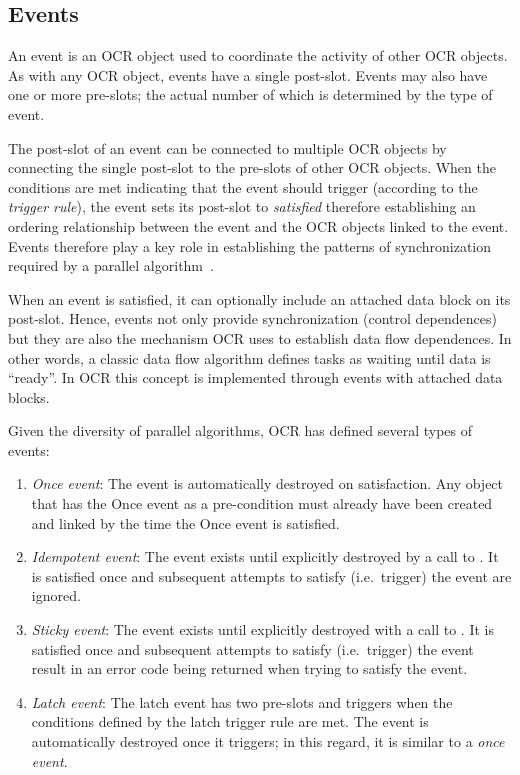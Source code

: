 \subsection{Events}
\label{sec:Event}

An event is an OCR object used to coordinate the activity of other OCR
objects. As with any OCR object, events have a single
post-slot. Events may also have one or more pre-slots; the actual
number of which is determined by the type of event.

The post-slot of an event can be connected to multiple OCR objects by
connecting the single post-slot to the pre-slots of other OCR objects.
When the conditions are met indicating that the event should trigger
(according to the \emph{trigger rule}), the event
sets its post-slot to \emph{satisfied} therefore establishing an
ordering relationship between the event and the OCR objects linked to
the event. Events therefore play a key role in establishing the
patterns of synchronization required by a parallel
algorithm~\cite{ImSa14-2}.

When an event is satisfied, it can optionally include an attached
data block on its post-slot. Hence, events not only provide synchronization
(control dependences) but they are also the mechanism OCR uses to
establish data flow dependences. In other words, a classic data flow
algorithm defines tasks as waiting until data is ``ready''. In OCR
this concept is implemented through events with attached data blocks.

Given the diversity of parallel algorithms, OCR has defined several
types of events:
\begin{enumerate}
\item \emph{Once event}: The event is automatically
destroyed on satisfaction. Any object that has the Once event as a
pre-condition must already have been created and linked by the time
the Once event is satisfied.

\item \emph{Idempotent event}: The event
exists until explicitly destroyed by a call to
. It is satisfied once and subsequent attempts
to satisfy (i.e.\ trigger) the event are ignored.

\item \emph{Sticky event}: The event exists until
explicitly destroyed with a call to . It is
satisfied once and subsequent attempts to satisfy (i.e.\ trigger) the
event result in an error code being returned when trying to satisfy
the event.
\item \emph{Latch event}: The latch event has two
pre-slots and triggers when the conditions defined by the latch
trigger rule are met. The event is automatically destroyed once it
triggers; in this regard, it is similar to a \emph{once event}.
\end{enumerate}

